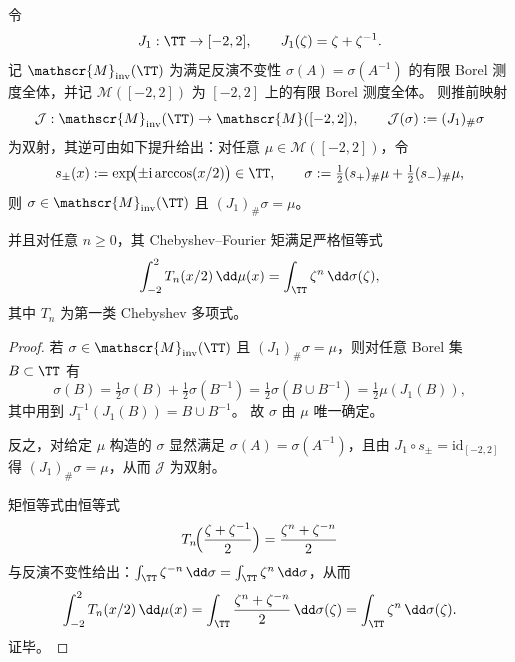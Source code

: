 \begin{proposition}[\texorpdfstring{$L=1$}{L=1} 退化下的测度提升与 Chebyshev--Fourier 传输]\label{prop:xi-joukowsky-L1-measure-lift-chebyshev-fourier}
令
\[
J_1:\TT\to[-2,2],\qquad J_1(\zeta)=\zeta+\zeta^{-1}.
\]
记 \(\mathscr{M}_{\mathrm{inv}}(\TT)\) 为满足反演不变性 \(\sigma(A)=\sigma(A^{-1})\) 的有限 Borel 测度全体，并记 \(\mathscr{M}([-2,2])\) 为 \([-2,2]\) 上的有限 Borel 测度全体。
则推前映射
\[
\mathcal{J}:\mathscr{M}_{\mathrm{inv}}(\TT)\to\mathscr{M}([-2,2]),
\qquad
\mathcal{J}(\sigma):=(J_1)_{\#}\sigma
\]
为双射，其逆可由如下提升给出：对任意 \(\mu\in\mathscr{M}([-2,2])\)，令
\[
s_{\pm}(x):=\exp\!\bigl(\pm\mathrm{i}\arccos(x/2)\bigr)\in\TT,
\qquad
\sigma:=\tfrac12(s_{+})_{\#}\mu+\tfrac12(s_{-})_{\#}\mu,
\]
则 \(\sigma\in\mathscr{M}_{\mathrm{inv}}(\TT)\) 且 \((J_1)_{\#}\sigma=\mu\)。
\par
并且对任意 \(n\ge 0\)，其 Chebyshev--Fourier 矩满足严格恒等式
\[
\int_{-2}^{2} T_n(x/2)\,\dd\mu(x)=\int_{\TT}\zeta^n\,\dd\sigma(\zeta),
\]
其中 \(T_n\) 为第一类 Chebyshev 多项式。
\end{proposition}
\begin{proof}
若 \(\sigma\in\mathscr{M}_{\mathrm{inv}}(\TT)\) 且 \((J_1)_{\#}\sigma=\mu\)，则对任意 Borel 集 \(B\subset\TT\) 有
\[
\sigma(B)=\tfrac12\sigma(B)+\tfrac12\sigma(B^{-1})
=\tfrac12\sigma(B\cup B^{-1})
=\tfrac12\mu(J_1(B)),
\]
其中用到 \(J_1^{-1}(J_1(B))=B\cup B^{-1}\)。
故 \(\sigma\) 由 \(\mu\) 唯一确定。
\par
反之，对给定 \(\mu\) 构造的 \(\sigma\) 显然满足 \(\sigma(A)=\sigma(A^{-1})\)，且由 \(J_1\circ s_{\pm}=\mathrm{id}_{[-2,2]}\) 得 \((J_1)_{\#}\sigma=\mu\)，从而 \(\mathcal{J}\) 为双射。
\par
矩恒等式由恒等式
\[
T_n\!\Bigl(\frac{\zeta+\zeta^{-1}}{2}\Bigr)=\frac{\zeta^n+\zeta^{-n}}{2}
\]
与反演不变性给出：\(\int_{\TT}\zeta^{-n}\,\dd\sigma=\int_{\TT}\zeta^{n}\,\dd\sigma\)，从而
\[
\int_{-2}^{2}T_n(x/2)\,\dd\mu(x)
=\int_{\TT}\frac{\zeta^n+\zeta^{-n}}{2}\,\dd\sigma(\zeta)
=\int_{\TT}\zeta^n\,\dd\sigma(\zeta).
\]
证毕。
\end{proof}

\endinput
